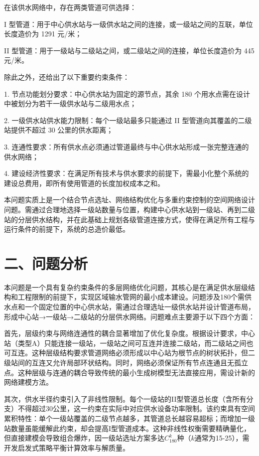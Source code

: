 \documentclass[12pt,a4paper]{article}
\begin{document}
在该供水网络中，存在两类管道可供选择：

I 型管道：用于中心供水站与一级供水站之间的连接，或一级站之间的互联，单位长度造价为 1291 元/米；

II 型管道：用于一级站与二级站之间，或二级站之间的连接，单位长度造价为 445 元/米。

除此之外，还给出了以下重要约束条件：

1. 节点功能划分要求：中心供水站为固定的源节点，其余 180 个用水点需在设计中被划分为若干一级供水站与二级用水点；

2. 一级供水站供水能力限制：每个一级站最多只能通过 II 型管道向其覆盖的二级站提供不超过 30 公里的供水距离；

3. 连通性要求：所有供水点必须通过管道最终与中心供水站形成一张完整连通的供水网络；

4. 建设经济性要求：在满足所有技术与供水要求的前提下，需最小化整个系统的建设总费用，即所有使用管道的长度加权成本之和。

本问题实质上是一个结合节点选址、网络结构优化与多重约束控制的空间网络设计问题。需通过合理地选择一级站数量与位置，构建中心供水站到一级站、再到二级站的分层供水结构，并在此基础上规划各级管道连接方式，使得在满足所有工程与运行条件的前提下，系统的总造价最低。

\section*{\centering 二、问题分析}
本问题是一个具有复杂约束条件的多层网络优化问题，其核心是在满足供水层级结构和工程限制的前提下，实现区域输水管网的最小成本建设。问题涉及180个需供水点和一个固定位置的中心供水站，需通过合理选址一级供水站并设计管道布局，形成中心站→一级站→二级站的分层供水网络。问题难点主要源于以下四个方面：

首先，层级约束与网络连通性的耦合显著增加了优化复杂度。根据设计要求，中心站（类型A）只能连接一级站，一级站之间可互连并连接二级站，而二级站之间也可互连。这种层级结构要求管道网络必须形成以中心站为根节点的树状拓扑，但二级站间的互连又允许局部环状结构。同时，网络必须保证所有节点连通且无孤立点。这种层级与连通的耦合导致传统的最小生成树模型无法直接应用，需设计新的网络建模方法。

其次，供水半径约束引入了非线性限制。每个一级站的II型管道总长度（含所有分支）不得超过30公里，这一约束在实际中对应供水设备功率限制。该约束具有空间累积特性：单个一级站覆盖的二级节点越多，其管道总长越容易超标；而增加一级站数量虽能缓解此约束，却会提高I型管道成本。这种非线性权衡需要精确量化，但直接建模会导致组合爆炸，因一级站选址方案多达$C_{180}^{k}$种（$k$通常为15-25），需开发启发式策略平衡计算效率与解质量。
\end{document}
